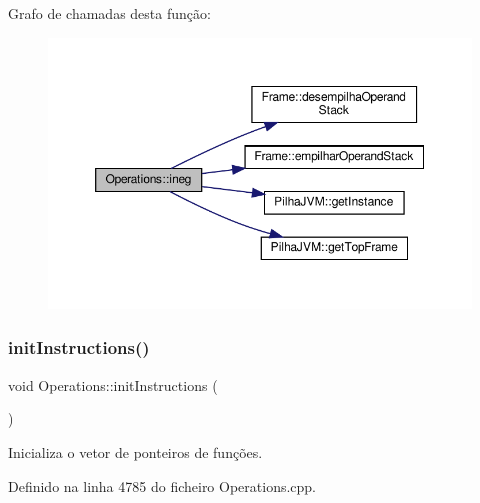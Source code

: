 Grafo de chamadas desta função\+:\nopagebreak
\begin{figure}[H]
\begin{center}
\leavevmode
\includegraphics[width=350pt]{classOperations_a819d5dd66c64a6801a1599b5abf81ae7_cgraph}
\end{center}
\end{figure}
\mbox{\label{classOperations_ae0d60fc4bf4279ae24bdb47cb3634045}} 
\subsubsection{\texorpdfstring{init\+Instructions()}{initInstructions()}}
{\footnotesize\ttfamily void Operations\+::init\+Instructions (\begin{DoxyParamCaption}{ }\end{DoxyParamCaption})\hspace{0.3cm}{\ttfamily [private]}}



Inicializa o vetor de ponteiros de funções. 



Definido na linha 4785 do ficheiro Operations.\+cpp.



